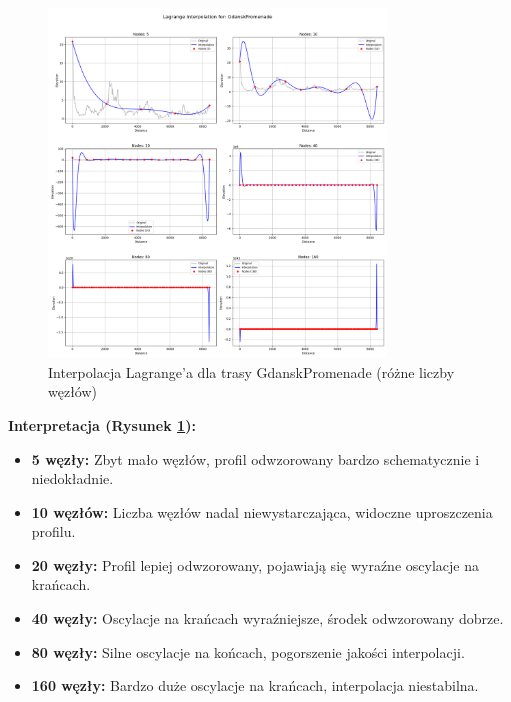 \documentclass[11pt,a4paper]{article}
\begin{document}
\begin{figure}[H]
    \centering
    \includegraphics[width=0.8\textwidth]{plots/GdanskPromenade_Lagrange_basic.png}
    \caption{Interpolacja Lagrange'a dla trasy GdanskPromenade (różne liczby węzłów)}
    \label{fig:promenade_lagrange}
\end{figure}
\textbf{Interpretacja (Rysunek \ref{fig:promenade_lagrange}):} 
\begin{itemize}
    \item \textbf{5 węzły:} Zbyt mało węzłów, profil odwzorowany bardzo schematycznie i niedokładnie.
    \item \textbf{10 węzłów:} Liczba węzłów nadal niewystarczająca, widoczne uproszczenia profilu.
    \item \textbf{20 węzły:} Profil lepiej odwzorowany, pojawiają się wyraźne oscylacje na krańcach.
    \item \textbf{40 węzły:} Oscylacje na krańcach wyraźniejsze, środek odwzorowany dobrze.
    \item \textbf{80 węzły:} Silne oscylacje na końcach, pogorszenie jakości interpolacji.
    \item \textbf{160 węzły:} Bardzo duże oscylacje na krańcach, interpolacja niestabilna.
\end{itemize}
\end{document}

